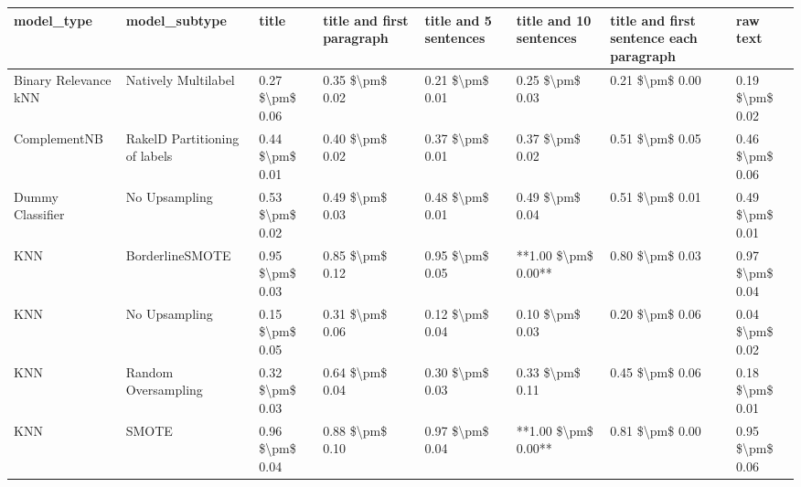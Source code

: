 \begin{tabular}{llllllll}
\toprule
                     model\_type &                 model\_subtype &           title & title and first paragraph & title and 5 sentences & title and 10 sentences & title and first sentence each paragraph &        raw text \\
\midrule
           Binary Relevance kNN &           Natively Multilabel & 0.27 \$\textbackslash pm\$ 0.06 &           0.35 \$\textbackslash pm\$ 0.02 &       0.21 \$\textbackslash pm\$ 0.01 &        0.25 \$\textbackslash pm\$ 0.03 &                         0.21 \$\textbackslash pm\$ 0.00 & 0.19 \$\textbackslash pm\$ 0.02 \\
                   ComplementNB & RakelD Partitioning of labels & 0.44 \$\textbackslash pm\$ 0.01 &           0.40 \$\textbackslash pm\$ 0.02 &       0.37 \$\textbackslash pm\$ 0.01 &        0.37 \$\textbackslash pm\$ 0.02 &                         0.51 \$\textbackslash pm\$ 0.05 & 0.46 \$\textbackslash pm\$ 0.06 \\
               Dummy Classifier &                 No Upsampling & 0.53 \$\textbackslash pm\$ 0.02 &           0.49 \$\textbackslash pm\$ 0.03 &       0.48 \$\textbackslash pm\$ 0.01 &        0.49 \$\textbackslash pm\$ 0.04 &                         0.51 \$\textbackslash pm\$ 0.01 & 0.49 \$\textbackslash pm\$ 0.01 \\
                            KNN &               BorderlineSMOTE & 0.95 \$\textbackslash pm\$ 0.03 &           0.85 \$\textbackslash pm\$ 0.12 &       0.95 \$\textbackslash pm\$ 0.05 &    **1.00 \$\textbackslash pm\$ 0.00** &                         0.80 \$\textbackslash pm\$ 0.03 & 0.97 \$\textbackslash pm\$ 0.04 \\
                            KNN &                 No Upsampling & 0.15 \$\textbackslash pm\$ 0.05 &           0.31 \$\textbackslash pm\$ 0.06 &       0.12 \$\textbackslash pm\$ 0.04 &        0.10 \$\textbackslash pm\$ 0.03 &                         0.20 \$\textbackslash pm\$ 0.06 & 0.04 \$\textbackslash pm\$ 0.02 \\
                            KNN &           Random Oversampling & 0.32 \$\textbackslash pm\$ 0.03 &           0.64 \$\textbackslash pm\$ 0.04 &       0.30 \$\textbackslash pm\$ 0.03 &        0.33 \$\textbackslash pm\$ 0.11 &                         0.45 \$\textbackslash pm\$ 0.06 & 0.18 \$\textbackslash pm\$ 0.01 \\
                            KNN &                         SMOTE & 0.96 \$\textbackslash pm\$ 0.04 &           0.88 \$\textbackslash pm\$ 0.10 &       0.97 \$\textbackslash pm\$ 0.04 &    **1.00 \$\textbackslash pm\$ 0.00** &                         0.81 \$\textbackslash pm\$ 0.00 & 0.95 \$\textbackslash pm\$ 0.06 \\

\end{tabular}
